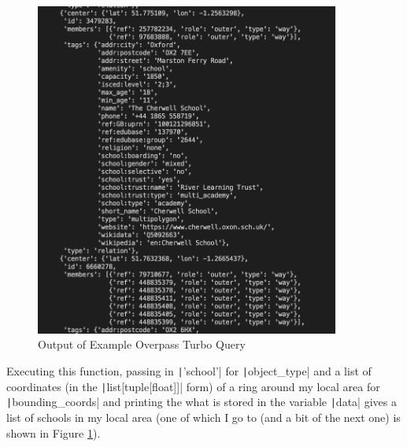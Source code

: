 \documentclass[12pt]{report}
\newcommand{\pil}[1]{\protect\texttt|#1|}
\begin{document}
\begin{figure}[H]
\centering
\includegraphics[width=10cm]{ss2.1.png}
\caption{Output of Example Overpass Turbo Query}\label{fig:ss2.1}
\end{figure}
Executing this function, passing in \pil{'school'} for \pil{object_type} and a list of coordinates (in the \pil{list[tuple[float]]} form) of a ring around my local area for \pil{bounding_coords} and printing the what is stored in the variable \pil{data} gives a list of schools in my local area (one of which I go to (and a bit of the next one) is shown in Figure \ref{fig:ss2.1}).

\begin{center}
\end{center}
\end{document}
